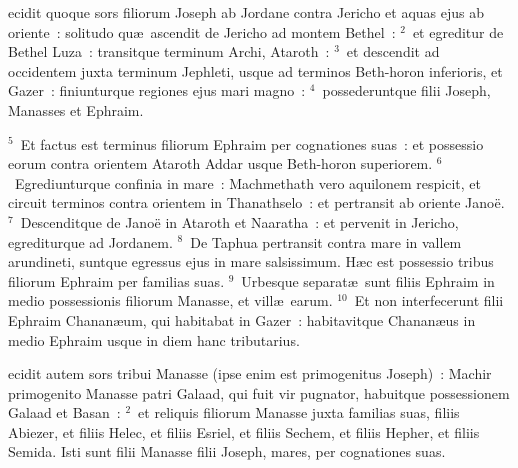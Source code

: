 \bchapter
{}ecidit quoque sors filiorum Joseph ab Jordane contra Jericho et aquas ejus ab oriente~: solitudo qu\ae\ ascendit de Jericho ad montem Bethel~:
${}^{2}$~et egreditur de Bethel Luza~: transitque terminum Archi, Ataroth~:
${}^{3}$~et descendit ad occidentem juxta terminum Jephleti, usque ad terminos Beth-horon inferioris, et Gazer~: finiunturque regiones ejus mari magno~:
${}^{4}$~possederuntque filii Joseph, Manasses et Ephraim.


${}^{5}$~Et factus est terminus filiorum Ephraim per cognationes suas~: et possessio eorum contra orientem Ataroth Addar usque Beth-horon superiorem.
${}^{6}$~Egrediunturque confinia in mare~: Machmethath vero aquilonem respicit, et circuit terminos contra orientem in Thanathselo~: et pertransit ab oriente Jano\"e.
${}^{7}$~Descenditque de Jano\"e in Ataroth et Naaratha~: et pervenit in Jericho, egrediturque ad Jordanem.
${}^{8}$~De Taphua pertransit contra mare in vallem arundineti, suntque egressus ejus in mare salsissimum. H\ae c est possessio tribus filiorum Ephraim per familias suas.
${}^{9}$~Urbesque separat\ae\ sunt filiis Ephraim in medio possessionis filiorum Manasse, et vill\ae\ earum.
${}^{10}$~Et non interfecerunt filii Ephraim Chanan\ae um, qui habitabat in Gazer~: habitavitque Chanan\ae us in medio Ephraim usque in diem hanc tributarius.

\bchapter
{}ecidit autem sors tribui Manasse (ipse enim est primogenitus Joseph)~: Machir primogenito Manasse patri Galaad, qui fuit vir pugnator, habuitque possessionem Galaad et Basan~:
${}^{2}$~et reliquis filiorum Manasse juxta familias suas, filiis Abiezer, et filiis Helec, et filiis Esriel, et filiis Sechem, et filiis Hepher, et filiis Semida. Isti sunt filii Manasse filii Joseph, mares, per cognationes suas.


